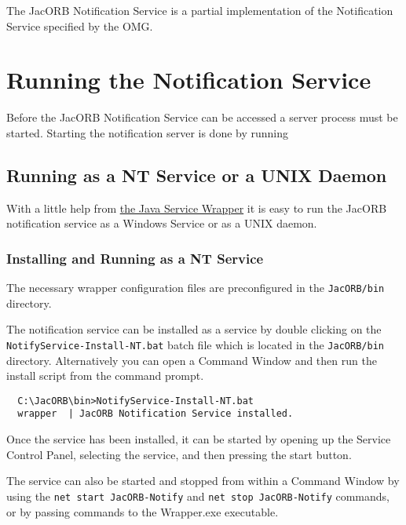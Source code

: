 %
%

The JacORB Notification Service is a partial implementation of
the Notification Service specified by the OMG.

\section{Running the Notification Service}
\label{sec:ntfy-running}

Before the JacORB Notification Service can be accessed a server
process must be started. Starting
the notification server is done by running



\subsection{Running as a NT Service or a UNIX Daemon}
\label{sec:runn-notif-serv-1}

With a little help from
\href{http://wrapper.tanukisoftware.org}{the Java Service Wrapper} it is
easy to run the JacORB notification service as a Windows Service or as
a UNIX daemon. 

\subsubsection{Installing and Running as a NT Service}
\label{sec:windows-service}

The necessary wrapper configuration files are preconfigured in the
\texttt{JacORB/bin} directory. 

The notification service can be installed as a service by double
clicking on the \texttt{NotifyService-Install-NT.bat} batch file which
is located in the \texttt{JacORB/bin} directory.
Alternatively you can open a Command Window and then run the install
script from the command prompt. 

\begin{verbatim}
  C:\JacORB\bin>NotifyService-Install-NT.bat
  wrapper  | JacORB Notification Service installed.
\end{verbatim}

Once the service has been installed, it can be started by opening up
the Service Control Panel, selecting the service, and then pressing
the start button.

The service can also be started and stopped from within a Command
Window by using the \texttt{net start JacORB-Notify} and \texttt{net
  stop JacORB-Notify} commands, or 
by passing commands to the Wrapper.exe executable. 

